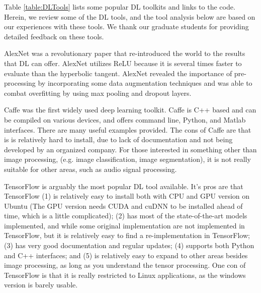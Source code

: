 \documentclass[12pt]{spieman}
\begin{document}
\begin{spacing}{1}
Table \ref{table:DLTools} lists some popular DL toolkits and links to the code. Herein, we review some of the DL tools, and the tool analysis below are based on our experiences with these tools. We thank our graduate students for providing detailed feedback on these tools. 

AlexNet \cite{krizhevsky2012imagenet} was a revolutionary paper that re-introduced the world to the results that DL can offer. AlexNet utilizes ReLU because it is several times faster to evaluate than the hyperbolic tangent. AlexNet revealed the importance of pre-processing by incorporating some data augmentation techniques and was able to combat overfitting by using max pooling and dropout layers.  

Caffe \cite{Jia2014Caffe} was the first widely used deep learning toolkit. Caffe is C++ based and can be compiled on various devices, and offers command line, Python, and Matlab interfaces. There are many useful examples provided. The cons of Caffe are that is is relatively hard to install, due to lack of documentation and not being developed by an organized company. For those interested in something other than image processing, (e.g. image classification, image segmentation), it is not really suitable for other areas, such as audio signal processing.

TensorFlow \cite{abadi2016tensorflow} is arguably the most popular DL tool available. It's pros are that TensorFlow (1) is relatively easy to install both with CPU and GPU version on Ubuntu (The GPU version needs CUDA and cuDNN to be installed ahead of time, which is a little complicated); (2) has most of the state-of-the-art models implemented, and while some original implementation are not implemented in TensorFlow, but it is relatively easy to find a re-implementation in TensorFlow; (3) has very good documentation and regular updates; (4) supports both Python and C++ interfaces; and (5) is relatively easy to expand to other areas besides image processing, as long as you understand the tensor processing. One con of TensorFlow is that it is really restricted to Linux applications, as the windows version is barely usable.


\end{spacing}
\end{document}
